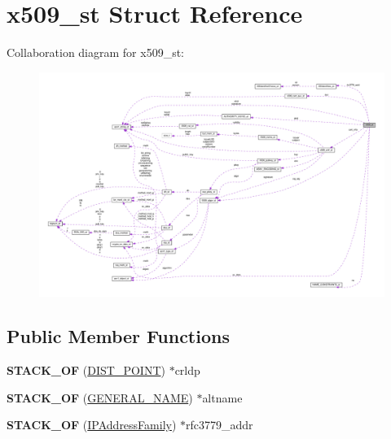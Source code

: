 \hypertarget{structx509__st}{}\section{x509\+\_\+st Struct Reference}
\label{structx509__st}


Collaboration diagram for x509\+\_\+st\+:
\nopagebreak
\begin{figure}[H]
\begin{center}
\leavevmode
\includegraphics[width=350pt]{structx509__st__coll__graph}
\end{center}
\end{figure}
\subsection*{Public Member Functions}
\begin{DoxyCompactItemize}
\item 
\mbox{\label{structx509__st_afb336a1ff1a941897a28c7cf4690db37}} 
{\bfseries S\+T\+A\+C\+K\+\_\+\+OF} (\hyperlink{structDIST__POINT__st}{D\+I\+S\+T\+\_\+\+P\+O\+I\+NT}) $\ast$crldp
\item 
\mbox{\label{structx509__st_a3e784234d8bcf39deead74981e486435}} 
{\bfseries S\+T\+A\+C\+K\+\_\+\+OF} (\hyperlink{structGENERAL__NAME__st}{G\+E\+N\+E\+R\+A\+L\+\_\+\+N\+A\+ME}) $\ast$altname
\item 
\mbox{\label{structx509__st_aa297b23d7f80b42d209432a0613872be}} 
{\bfseries S\+T\+A\+C\+K\+\_\+\+OF} (\hyperlink{structIPAddressFamily__st}{I\+P\+Address\+Family}) $\ast$rfc3779\+\_\+addr
\end{DoxyCompactItemize}
